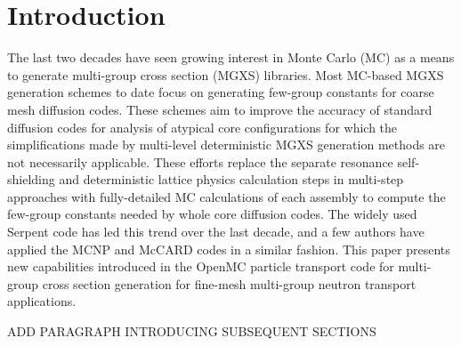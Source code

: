 \section{Introduction}
\label{sec:intro}

The last two decades have seen growing interest in Monte Carlo (MC) as a means to generate multi-group cross section (MGXS) libraries. Most MC-based MGXS generation schemes to date focus on generating few-group constants for coarse mesh diffusion codes. These schemes aim to improve the accuracy of standard diffusion codes for analysis of atypical core configurations for which the simplifications made by multi-level deterministic MGXS generation methods are not necessarily applicable. These efforts replace the separate resonance self-shielding and deterministic lattice physics calculation steps in multi-step approaches with fully-detailed MC calculations of each assembly to compute the few-group constants needed by whole core diffusion codes. The widely used Serpent code\cite{leppanen2015serpent} has led this trend over the last decade, and a few authors have applied the MCNP\cite{pounders2006stochastically} and McCARD\cite{shim2008generation} codes in a similar fashion. This paper presents new capabilities introduced in the OpenMC\cite{romano2015openmc} particle transport code for multi-group cross section generation for fine-mesh multi-group neutron transport applications.

ADD PARAGRAPH INTRODUCING SUBSEQUENT SECTIONS
